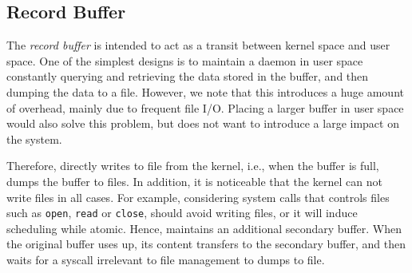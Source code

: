 \subsection{Record Buffer}

The \textit{record buffer} is intended to act as a transit between kernel space and user space. One of the simplest designs is to maintain a daemon in user space constantly querying and retrieving the data stored in the buffer, and then dumping the data to a file. However, we note that this introduces a huge amount of overhead, mainly due to frequent file I/O. Placing a larger buffer in user space would also solve this problem, but \TheName does not want to introduce a large impact on the system.

Therefore, \TheName directly writes to file from the kernel, i.e., when the buffer is full, \TheName dumps the buffer to files. In addition, it is noticeable that the kernel can not write files in all cases. For example, considering system calls that controls files such as \texttt{open}, \texttt{read} or \texttt{close}, \TheName should avoid writing files, or it will induce scheduling while atomic. Hence, \TheName maintains an additional secondary buffer. When the original buffer uses up, its content transfers to the secondary buffer, and then waits for a syscall irrelevant to file management to dumps to file.